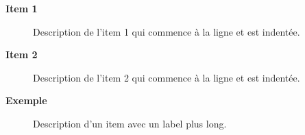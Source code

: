 \documentclass{article}
\begin{document}

\begin{description}
    \item[\textbf{Item 1}] Description de l'item 1 qui commence à la ligne et est indentée.
    \item[\textbf{Item 2}] Description de l'item 2 qui commence à la ligne et est indentée.
    \item[\textbf{Exemple}] Description d'un item avec un label plus long.
\end{description}
\end{document}
